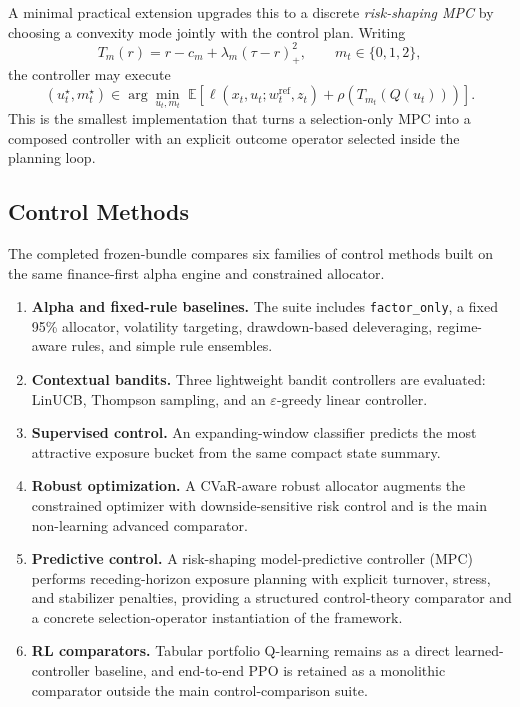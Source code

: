 \documentclass[10pt,twocolumn]{article}
\begin{document}
A minimal practical extension upgrades this to a discrete
\emph{risk-shaping MPC} by choosing a convexity mode jointly with the control
plan. Writing
\[
T_m(r)=r-c_m+\lambda_m(\tau-r)_+^2,
\qquad m_t \in \{0,1,2\},
\]
the controller may execute
\[
(u_t^\star, m_t^\star)
\in
\arg\min_{u_t,m_t}\;
\mathbb{E}\!\left[
\ell(x_t,u_t;w_t^{\mathrm{ref}},z_t)
+ \rho\!\left(T_{m_t}(Q(u_t))\right)
\right].
\]
This is the smallest implementation that turns a selection-only MPC into a
composed controller with an explicit outcome operator selected inside the
planning loop.

\subsection{Control Methods}

The completed frozen-bundle compares six families of control methods built on
the same finance-first alpha engine and constrained allocator.
\begin{enumerate}[leftmargin=1.5em, itemsep=2pt, topsep=4pt]
\item \textbf{Alpha and fixed-rule baselines.} The suite includes
      \texttt{factor\_only}, a fixed 95\% allocator, volatility targeting,
      drawdown-based deleveraging, regime-aware rules, and simple rule
      ensembles.
\item \textbf{Contextual bandits.} Three lightweight bandit controllers are
      evaluated: LinUCB, Thompson sampling, and an $\varepsilon$-greedy linear
      controller.
\item \textbf{Supervised control.} An expanding-window classifier predicts the
      most attractive exposure bucket from the same compact state summary.
\item \textbf{Robust optimization.} A CVaR-aware robust allocator augments the
      constrained optimizer with downside-sensitive risk control and is the
      main non-learning advanced comparator.
\item \textbf{Predictive control.} A risk-shaping model-predictive controller
      (MPC) performs receding-horizon exposure planning with explicit turnover,
      stress, and stabilizer penalties, providing a structured
      control-theory comparator and a concrete selection-operator
      instantiation of the framework.
\item \textbf{RL comparators.} Tabular portfolio Q-learning remains as a direct
      learned-controller baseline, and end-to-end PPO is retained as a
      monolithic comparator outside the main control-comparison suite.
\end{enumerate}
\end{document}
